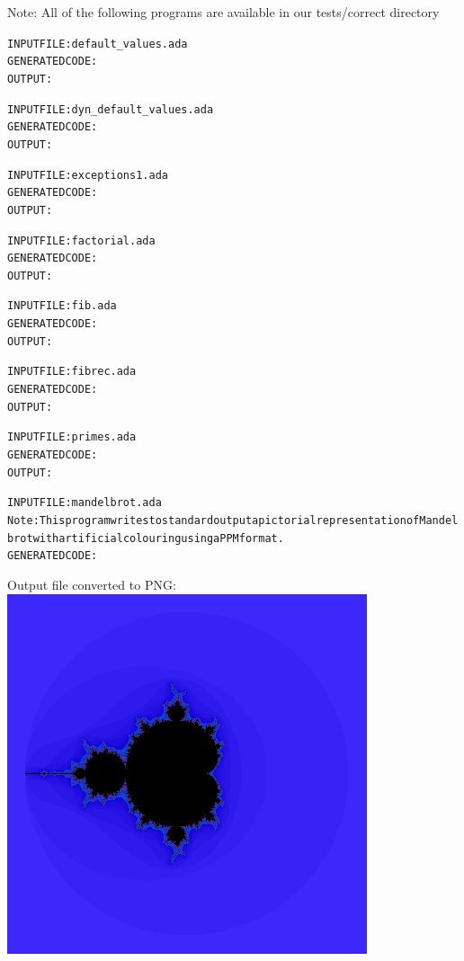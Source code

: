 \documentclass[onecolumn,11pt]{article}
\begin{document}
Note: All of the following programs are available in our tests/correct directory

\begin{alltt}
INPUT FILE: default_values.ada
GENERATED CODE:
OUTPUT:

INPUT FILE: dyn_default_values.ada
GENERATED CODE:
OUTPUT:

INPUT FILE: exceptions1.ada
GENERATED CODE:
OUTPUT:

INPUT FILE: factorial.ada
GENERATED CODE:
OUTPUT:

INPUT FILE: fib.ada
GENERATED CODE:
OUTPUT:

INPUT FILE: fibrec.ada
GENERATED CODE:
OUTPUT:

INPUT FILE: primes.ada
GENERATED CODE:
OUTPUT:

INPUT FILE: mandelbrot.ada
Note: This program writes to standard output a pictorial representation of Mandelbrot with artificial colouring using a PPM format.
GENERATED CODE:
\end{alltt}

Output file converted to PNG: \\
\includegraphics[scale=1.0]{correct/brot.png}
\end{document}
